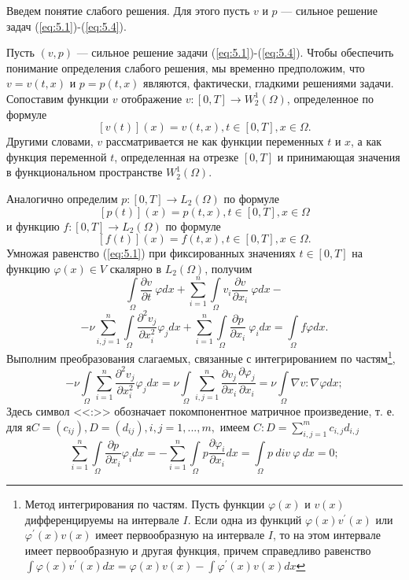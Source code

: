 Введем понятие слабого решения. Для этого пусть $v$ и $p$ --- сильное решение задач (\ref{eq:5.1})-(\ref{eq:5.4}).

Пусть $(v, p)$ --- сильное решение задачи (\ref{eq:5.1})-(\ref{eq:5.4}).
Чтобы обеспечить понимание определения слабого решения, мы временно предположим, что $v=v(t, x)$ и $p=p(t, x)$ являются, фактически, гладкими решениями задачи.
Сопоставим функции $v$ отображение $v:[0, T]\rightarrow W^1_2(\Omega)$, определенное по формуле $$[v(t)](x)=v(t, x), t\in[0, T], x\in\Omega.$$
Другими словами, $v$ рассматривается не как функции переменных $t$ и $x$, а как функция переменной $t$, определенная на отрезке
$[0, T]$ и принимающая значения в функциональном пространстве $W^1_2(\Omega)$.

Аналогично определим $p:[0, T]\rightarrow L_2(\Omega)$ по формуле $$[p(t)](x)=p(t, x), t\in[0, T], x\in\Omega$$
и функцию $f:[0, T]\rightarrow L_2(\Omega)$ по формуле $$[f(t)](x)=f(t, x), t\in[0, T], x\in\Omega.$$
Умножая равенство (\ref{eq:5.1}) при фиксированных значениях $t\in [0, T]$ на функцию $\varphi (x)\in V$ скалярно в $L_2(\Omega)$, получим
$$\int\limits_\Omega \frac{\partial v}{\partial t}\ \varphi dx+\sum_{i=1}^n\int\limits_\Omega v_i\frac{\partial v}{\partial x_i}\ \varphi dx-$$
$$-\nu \sum_{i, j=1}^n\int\limits_\Omega\frac{\partial^2 v_j}{\partial x^{2}_i} \varphi_j dx+
\sum_{i=1}^n\int\limits_\Omega \frac{\partial p}{\partial x_i}\ \varphi_idx=\int\limits_\Omega f\varphi dx.$$
Выполним преобразования слагаемых, связанные с интегрированием по частям\footnote{Метод интегрирования по частям. Пусть функции $\varphi (x)$ и 
$v(x)$ дифференцируемы на интервале $I$. Если одна из функций $\varphi (x) v^\prime(x)$ или $\varphi^\prime (x) v(x)$ имеет первообразную
на интервале $I$, то на этом интервале имеет первообразную и другая функция, причем справедливо равенство 
$\int\varphi (x) v^\prime(x)dx=\varphi (x) v(x)-\int\varphi^\prime(x) v(x)dx$},
$$-\nu\int\limits_\Omega \sum_{i=1}^{n}\frac{\partial^2 v_j}{\partial x^{2}_i}\varphi_j dx=
\nu\int\limits_\Omega\sum_{i, j=1}^{n}\frac{\partial v_j}{\partial x_i}\frac{\partial \varphi_j}{\partial x_i}=\nu\int\limits_\Omega \nabla v:\nabla\varphi dx;$$
Здесь символ <<:>> обозначает покомпонентное матричное произведение, т. е. для $я C=(c_{ij}), D=(d_{ij}), i, j=1,...,m,$ имеем $C:D=\sum\limits_{i, j=1}^{m} c_{i, j}d_{i, j}$
$$\sum_{i=1}^{n}\int\limits_\Omega \frac{\partial p}{\partial x_i}\varphi_i dx
=-\sum_{i=1}^{n}\int\limits_\Omega p\frac{\partial \varphi_i}{\partial x_i}dx= \int\limits_\Omega p \ div \ \varphi \ dx=0;$$

